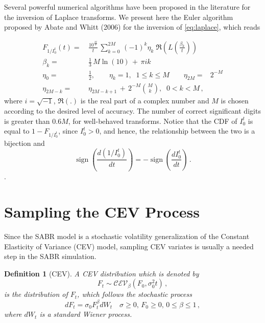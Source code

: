 \documentclass[12pt,oneside]{article}
\newcommand{\beqn}{\begin{equation}}
\newcommand{\eeqn}{\end{equation}}
\newcommand{\beqnn}{\begin{equation*}}
\newcommand{\eeqnn}{\end{equation*}}
\numberwithin{equation}{section}
\DeclareMathOperator*{\sgn}{sign}
\newtheorem{defn}{Definition}
\begin{document}
Several powerful numerical algorithms have been proposed in the literature for the
inversion of Laplace transforms.
We present here the Euler algorithm proposed by Abate and Whitt (2006)\cite{AW}
for the inversion of \eqref{eq:laplace}, which reads

\beqn\label{eq:euler}
\begin{aligned}
F_{1/I_0^t}(t) =\,&\frac{10^\frac{M}{3}}{t}\,\sum_{k=0}^{2M}\,(-1)^k\eta_k\;\Re\left(L(\frac{\beta_k}{t})\right)\\
\beta_k=\,&\frac{1}{3}\,M \ln(10)\,+\,\pi i k\\
\eta_0=\,&\frac{1}{2},\quad\quad\eta_k=1,\;\; 1\le k\le M\quad\quad\eta_{2M}=&2^{-M}\\
\eta_{2M-k}=\,&\eta_{2M-k+1}\,+\,2^{-M}{M\choose k},\;\; 0<k<M\,,
\end{aligned}
\eeqn
where $i=\sqrt{-1}$, $\Re(.)$ is the real part of a complex number
and $M$ is chosen according to the desired level of accuracy.
The number of correct significant digits is greater than $0.6M$,
for well-behaved transforms.
Notice that the CDF of $I_0^t$ is equal to $1-F_{1/I_0^t}$, since $I_0^t>0$,
and hence, the relationship between the two is a bijection and
\beqnn
\sgn(\frac{d(1/I_0^t)}{dt})=-\sgn(\frac{dI_0^t}{dt})\,.
\eeqnn.

\section{Sampling the CEV Process}\label{sec:cev}
Since the SABR model is a stochastic volatility generalization of the Constant Elasticity of
Variance (CEV) model, sampling CEV variates is usually a needed step in the SABR
simulation.
\begin{defn}[CEV]
A CEV distribution which is denoted by
\beqn
F_t\sim\mathcal{CEV}_\beta(F_0,\sigma^2_0t)\,,
\eeqn
is the distribution of $F_t$, which follows the stochastic process
\beqn
dF_t = \sigma_0 F_t^\beta dW_t\quad \sigma\!\ge\! 0,\, F_0\!\ge\! 0,\, 0\!\le\!\beta\!\le\! 1\,,
\eeqn
where $dW_t$ is a standard Wiener process.
\end{defn}
\end{document}
